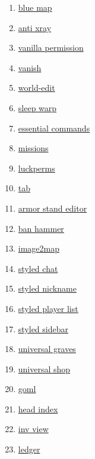 \begin{enumerate}
    \item \href{https://github.com/BlueMap-Minecraft/BlueMap}{blue map}
    \item \href{https://github.com/DrexHD/AntiXray}{anti xray}
    \item \href{https://github.com/DrexHD/VanillaPermissions}{vanilla permission}
    \item \href{https://github.com/DrexHD/Vanish}{vanish}
    \item \href{https://github.com/EngineHub/WorldEdit/}{world-edit}
    \item \href{https://github.com/Giggitybyte/SleepWarp}{sleep warp}
    \item \href{https://github.com/John-Paul-R/Essential-Commands}{essential commands}
    \item \href{https://github.com/Kryeit/Missions}{missions}
    \item \href{https://github.com/LuckPerms/LuckPerms}{luckperms}
    \item \href{https://github.com/NEZNAMY/TAB}{tab}
    \item \href{https://github.com/Patbox/ArmorStandEditor}{armor stand editor}
    \item \href{https://github.com/Patbox/BanHammer}{ban hammer}
    \item \href{https://github.com/Patbox/Image2Map}{image2map}
    \item \href{https://github.com/Patbox/StyledChat}{styled chat}
    \item \href{https://github.com/Patbox/StyledNicknames}{styled nickname}
    \item \href{https://github.com/Patbox/StyledPlayerList}{styled player list}
    \item \href{https://github.com/Patbox/StyledSidebars}{styled sidebar}
    \item \href{https://github.com/Patbox/UniversalGraves}{universal graves}
    \item \href{https://github.com/Patbox/UniversalShops}{universal shop}
    \item \href{https://github.com/Patbox/get-off-my-lawn-reserved}{goml}
    \item \href{https://github.com/PotatoPresident/HeadIndex}{head index}
    \item \href{https://github.com/PotatoPresident/InvView}{inv view}
    \item \href{https://github.com/QuiltServerTools/Ledger}{ledger}

\end{enumerate}
